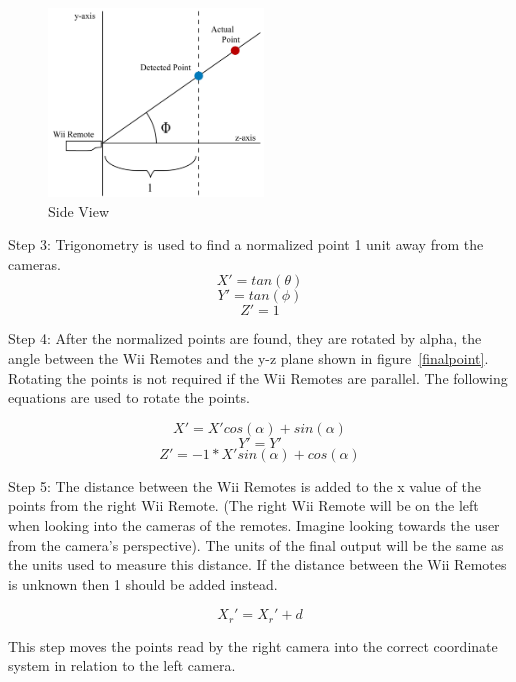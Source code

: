 \documentclass[a4paper,twoside]{article}
\begin{document}
\begin{indenteddescription}
\begin{figure}[t]
\begin{center}
\includegraphics[height = 5cm]{Diagram2_CalcSideView.png}
\end{center}
\caption{Side View}
\label{sideview}
\end{figure}

\item[Step 3:] Trigonometry is used to find a normalized point 1 unit away from the cameras.
\begin{equation}\label{eq1} X' = tan(\theta) \end{equation}
\begin{equation}\label{eq2} Y' = tan(\phi)  \end{equation}
\begin{equation}\label{eq3} Z' = 1          \end{equation}

\item[Step 4:] After the normalized points are found, they are rotated by alpha, the angle between the Wii Remotes and the y-z plane shown in figure~\ref{finalpoint}. Rotating the points is not required if the Wii Remotes are parallel. The following equations are used to rotate the points. 

\begin{flushleft}
\begin{equation}\label{eq4} X' = X'cos(\alpha) + sin(\alpha) \end{equation}
\begin{equation}\label{eq5} Y' = Y'\end{equation}
\begin{equation}\label{eq6} Z' = -1 * X'sin(\alpha) + cos(\alpha)\end{equation}
\end{flushleft}


\item[Step 5:] The distance between the Wii Remotes is added to the x value of the points from the right Wii Remote. (The right Wii Remote will be on the left when looking into the cameras of the remotes. Imagine looking towards the user from the camera's perspective). The units of the final output will be the same as the units used to measure this distance. If the distance between the Wii Remotes is unknown then 1 should be added instead.

\begin{equation}\label{eq7} X_{r}' = X_{r}' + d \end{equation}

This step moves the points read by the right camera into the correct coordinate system in relation to the left camera. 
\end{indenteddescription}
\end{document}
